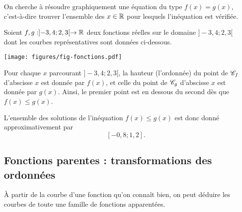 On cherche à résoudre graphiquement une équation du type $f(x)=g(x)$, c'est-à-dire trouver l'ensemble des $x\in\mathbb{R}$ pour lesquels l'inéquation est vérifiée.

Soient $f,g : ]{-}3,4 ; 2,3[ \rightarrow \mathbb{R}$ deux fonctions réelles sur le domaine $]{-}3,4 ; 2,3[$ dont les courbes représentatives sont données ci-dessous.

\begin{center}
\texttt{[image: figures/fig-fonctions.pdf]}
\end{center}

Pour chaque $x$ parcourant $]{-}3,4 ; 2,3[$, la hauteur (l'ordonnée) du point de $\mathcal{C}_f$ d'abscisse $x$ est donnée par $f(x)$, et celle du point de $\mathcal{C}_g$ d'abscisse $x$ est donnée par $g(x)$.
Ainsi, le premier point est en dessous du second dès que $f(x) \leq g(x)$.

L'ensemble des solutions de l'inéquation $f(x) \leq g(x)$ est donc donné approximativement par
	\[ [{-}0,8 ; 1,2 ]. \]





\newpage
\subsection{Fonctions parentes : transformations des ordonnées}

À partir de la courbe d'une fonction qu'on connaît bien, on peut déduire les courbes de toute une famille de fonctions apparentées.


